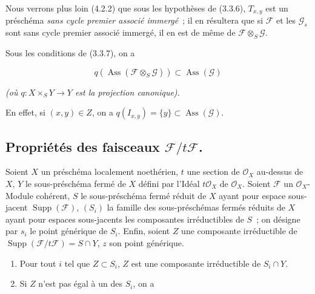 \begin{remarks}[3.3.8]
\label{IV.2.3.3.8-fr}
Nous verrons plus loin (4.2.2) que sous les hypothèses de (3.3.6),
$T_{x,y}$ est un préschéma \emph{sans cycle premier associé immergé}~; il en
résultera que si $\mathcal F$ et les $\mathcal G_s$ sont sans cycle premier
associé immergé, il en est de même de $\mathcal F\otimes_S\mathcal G$.
\end{remarks}

\begin{corollary}[3.3.9]
\label{IV.2.3.3.9-fr}
Sous les conditions de \textup{(3.3.7)}, on a
\end{corollary}

\begin{env}[3.3.9.1]
\label{IV.2.3.3.9.1-fr}
\[
q(\operatorname{Ass}(\mathcal F\otimes_S\mathcal G))
\subset\operatorname{Ass}(\mathcal G)
\]
\end{env}

\textit{(où $q:X\times_S Y\to Y$ est la projection canonique).}

En effet, si $(x,y)\in Z$, on a
$q(I_{x,y})=\{y\}\subset\operatorname{Ass}(\mathcal G)$.


\subsection{\texorpdfstring{Propriétés des faisceaux $\mathcal F/t\mathcal F$.}{Propriétés des faisceaux F/tF}}

\begin{proposition}[3.4.1]
\label{IV.2.3.4.1-fr}
Soient $X$ un préschéma localement noethérien, $t$ une section de
$\mathcal O_X$ au-dessus de $X$, $Y$ le sous-préschéma fermé de $X$ défini par
l'Idéal $t\mathcal O_X$ de $\mathcal O_X$. Soient $\mathcal F$ un
$\mathcal O_X$-Module cohérent, $S$ le sous-préschéma fermé réduit de $X$ ayant
pour espace sous-jacent $\operatorname{Supp}(\mathcal F)$, $(S_i)$ la famille
des sous-préschémas fermés réduits de $X$ ayant pour espaces sous-jacents les
composantes irréductibles de $S$~; on désigne par $s_i$ le point générique de
$S_i$. Enfin, soient $Z$ une composante irréductible de
$\operatorname{Supp}(\mathcal F/t\mathcal F)=S\cap Y$, $z$ son point
générique.
\begin{enumerate}
\item[\textup{(i)}] Pour tout $i$ tel que $Z\subset S_i$, $Z$ est une composante
irréductible de $S_i\cap Y$.
\item[\textup{(ii)}] Si $Z$ n'est pas égal à un des $S_i$, on a
\end{enumerate}
\end{proposition}


